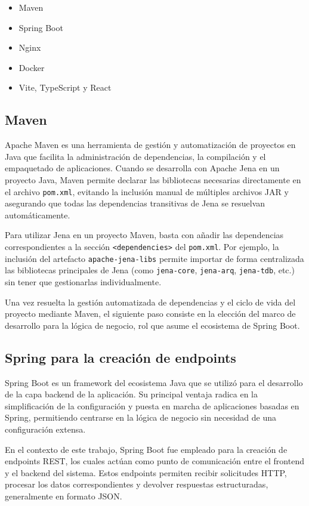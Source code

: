 \documentclass{article}
\begin{document}
\begin{itemize}
    \item Maven
    \item Spring Boot
    \item Nginx
    \item Docker
    \item Vite, TypeScript y React
\end{itemize}

\subsection{Maven}

Apache Maven\cite{maven} es una herramienta de gestión y automatización de proyectos en Java que facilita la administración de dependencias, la compilación y el empaquetado de aplicaciones. Cuando se desarrolla con Apache Jena en un proyecto Java, Maven permite declarar las bibliotecas necesarias directamente en el archivo \texttt{pom.xml}, evitando la inclusión manual de múltiples archivos JAR y asegurando que todas las dependencias transitivas de Jena se resuelvan automáticamente.

Para utilizar Jena en un proyecto Maven, basta con añadir las dependencias correspondientes a la sección \texttt{<dependencies>} del \texttt{pom.xml}. Por ejemplo, la inclusión del artefacto \texttt{apache-jena-libs} permite importar de forma centralizada las bibliotecas principales de Jena (como \texttt{jena-core}, \texttt{jena-arq}, \texttt{jena-tdb}, etc.) sin tener que gestionarlas individualmente.

Una vez resuelta la gestión automatizada de dependencias y el ciclo de vida del proyecto mediante Maven, el siguiente paso consiste en la elección del marco de desarrollo para la lógica de negocio, rol que asume el ecosistema de Spring Boot.

\subsection{Spring para la creación de endpoints}

Spring Boot\cite{spring_boot} es un framework del ecosistema Java que se utilizó para el desarrollo de la capa backend de la aplicación. Su principal ventaja radica en la simplificación de la configuración y puesta en marcha de aplicaciones basadas en Spring, permitiendo centrarse en la lógica de negocio sin necesidad de una configuración extensa.

En el contexto de este trabajo, Spring Boot fue empleado para la creación de endpoints REST, los cuales actúan como punto de comunicación entre el frontend y el backend del sistema. Estos endpoints permiten recibir solicitudes HTTP, procesar los datos correspondientes y devolver respuestas estructuradas, generalmente en formato JSON.
\end{document}

